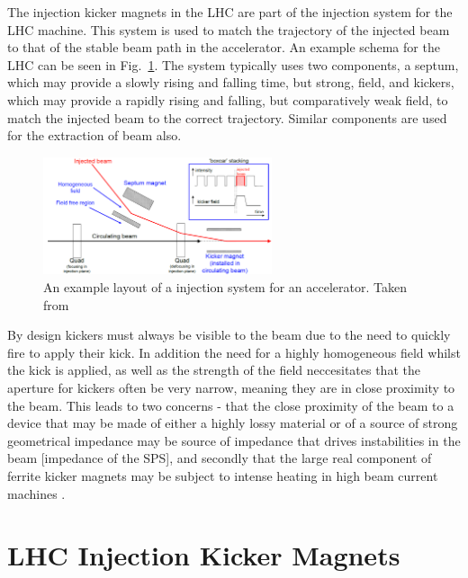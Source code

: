 The injection kicker magnets in the LHC are part of the injection system for the LHC machine. This system is used to match the trajectory of the injected beam to that of the stable beam path in the accelerator. An example schema for the LHC can be seen in Fig.~\ref{fig:injection-system-schema}. The system typically uses two components, a septum, which may provide a slowly rising and falling time, but strong, field, and kickers, which may provide a rapidly rising and falling, but comparatively weak field, to match the injected beam to the correct trajectory. Similar components are used for the extraction of beam also.

\begin{figure}
\begin{center}
\includegraphics[width=0.6\textwidth]{LHC_MKI/figures/injection-system.png}
\end{center}
\caption{An example layout of a injection system for an accelerator. Taken from \cite{Barnes:injSys}}
\label{fig:injection-system-schema}
\end{figure}

By design kickers must always be visible to the beam due to the need to quickly fire to apply their kick. In addition the need for a highly homogeneous field whilst the kick is applied, as well as the strength of the field neccesitates that the aperture for kickers often be very narrow, meaning they are in close proximity to the beam. This leads to two concerns - that the close proximity of the beam to a device that may be made of either a highly lossy material \cite{Day:wireMeasFerr, Barnes:wireMeasKick, Barnes:spsKickerHeating} or of a source of strong geometrical impedance \cite{Belver-Aguilar:clicStripline} may be source of impedance that drives instabilities in the beam [impedance of the SPS], and secondly that the large real component of ferrite kicker magnets may be subject to intense heating in high beam current machines \cite{Barnes:spsKickerHeating}. 

\section{LHC Injection Kicker Magnets}

